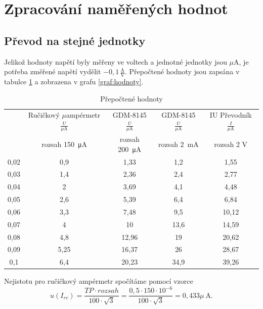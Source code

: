 \documentclass[a4paper,12pt]{article}   %
\newcommand{\tmu}{$\mu$}
\begin{document}
\section{Zpracování naměřených hodnot}

\subsection{Převod na stejné jednotky}
Jelikož hodnoty napětí byly měřeny ve voltech a jednotné jednotky jsou \tmu A, je potřeba změřené napětí vydělit $-0,1\,\frac{\textrm{A}}{\textrm{V}}$. Přepočtené hodnoty jsou zapsána v tabulce \ref{tab:prepocteno} a zobrazena v grafu \ref{graf:hodnoty}.

\begin{table}[h!]
    \centering
    \begin{tabular}{|c|c|c|c|c|}
        \hline
        \rule{0pt}{2.5ex}
        \multirow{2}{*}{Napětí na děliči $\frac{U}{\textrm{V}}$}& Ručičkový \tmu ampérmetr$\frac{U}{\mu\textrm{A}}$ 	&GDM-8145 $\frac{U}{\mu\textrm{A}}$	&GDM-8145 $\frac{U}{\mu\textrm{A}}$	&IU Převodník $\frac{I}{\mu\textrm{A}}$  \\[.7ex]
        & rozsah  150~μA & rozsah 200~μA & rozsah  2~mA & rozsah  2 V\\\hline\hline
        0,02    &0,9    &1,33   &1,2    &1,55   \\\hline
        0,03    &1,4    &2,36   &2,4    &2,77   \\\hline
        0,04    &2      &3,69   &4,1    &4,48   \\\hline
        0,05    &2,6    &5,39   &6,4    &6,84   \\\hline
        0,06    &3,3    &7,48   &9,5    &10,12  \\\hline
        0,07    &4      &10     &13,6   &14,59  \\\hline
        0,08    &4,8    &12,96  &19     &20,62  \\\hline
        0,09    &5,25   &16,37  &26     &28,67  \\\hline
        0,1     &6,4    &20,23  &34,9   &39,26  \\\hline
    \end{tabular}
    \caption{Přepočtené hodnoty}
    \label{tab:prepocteno}
\end{table}

Nejistotu pro ručičkový ampérmetr spočítáme pomocí vzorce
\begin{equation}
    u(I_{rv}) = \frac{TP\cdot rozsah}{100\cdot\sqrt{3}} = \frac{0,5\cdot 150\cdot 10^{-6}}{100\cdot\sqrt{3}} = 0,433 \mu ~\textrm{A.}
\end{equation}
\end{document}
